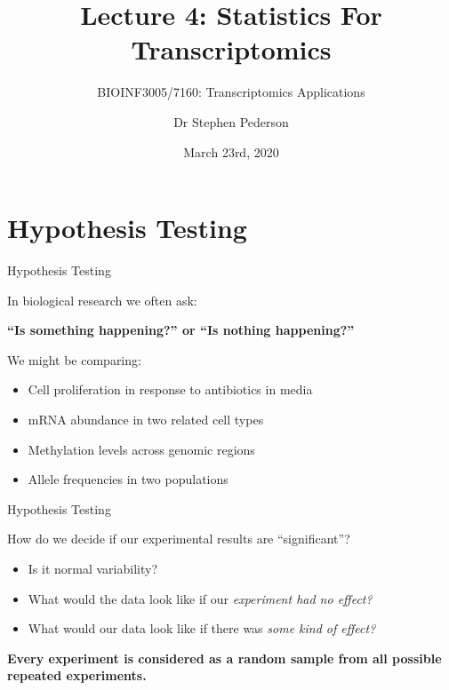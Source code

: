 \documentclass[aspectratio=169,11pt]{beamer}
\author{Dr Stephen Pederson}
\title{Lecture 4: Statistics For Transcriptomics}
\subtitle{BIOINF3005/7160: Transcriptomics Applications}
\institute{Bioinformatics Hub, \\The University of Adelaide}
\date{March 23rd, 2020}
\begin{document}
\begin{frame}
\titlepage
\end{frame}

\begin{frame}
\footnotesize
\tableofcontents
\end{frame}



\section{Hypothesis Testing}

\begin{frame}{Hypothesis Testing}

In biological research we often ask:

	\begin{center}
	\textbf{“Is something happening?” or “Is nothing happening?”}
	\end{center}

We might be comparing:

	\begin{itemize}
		\item Cell proliferation in response to antibiotics in media
		\item mRNA abundance in two related cell types
		\item Methylation levels across genomic regions
		\item Allele frequencies in two populations
	\end{itemize}

\end{frame}

\begin{frame}{Hypothesis Testing}

	How do we decide if our experimental results are “significant”?

	\begin{itemize}
		\item Is it normal variability?
		\item What would the data look like if our \textit{experiment had no effect?}
		\item What would our data look like if there was \textit{some kind of effect?}
	\end{itemize}
	
	\textbf{Every experiment is considered as a random sample from all possible repeated experiments.}

\end{frame}
\end{document}
